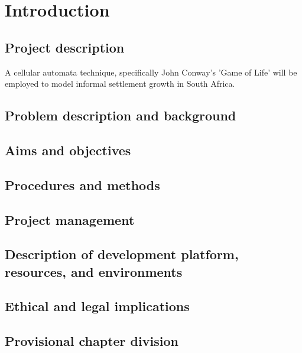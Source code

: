 
\chapter{Introduction} %

\label{Chapter1} %


\newcommand{\keyword}[1]{\textbf{#1}}
\newcommand{\tabhead}[1]{\textbf{#1}}
\newcommand{\code}[1]{\texttt{#1}}
\newcommand{\file}[1]{\texttt{\bfseries#1}}
\newcommand{\option}[1]{\texttt{\itshape#1}}


\section{Project description}
A cellular automata technique, specifically John Conway's 'Game of Life' will be employed to model informal settlement growth in South Africa.
\section{Problem description and background}
\section{Aims and objectives}
\section{Procedures and methods}
\section{Project management}
\section{Description of development platform, resources, and environments}
\section{Ethical and legal implications}
\section{Provisional chapter division}